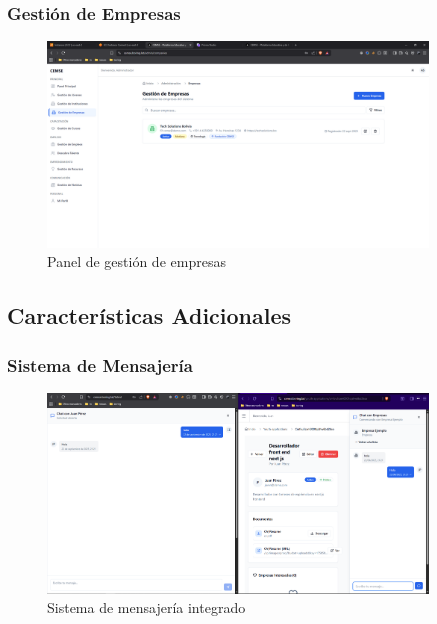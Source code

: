 \documentclass[12pt,a4paper]{article}
\begin{document}
\begin{enumerate}
\subsubsection{Gestión de Empresas}
\begin{figure}[H]
    \centering
    \includegraphics[width=0.9\textwidth]{screenshots/admin/company-management.png}
    \caption{Panel de gestión de empresas}
    \label{fig:admin-companies}
\end{figure}

\subsection{Características Adicionales}

\subsubsection{Sistema de Mensajería}
\begin{figure}[H]
    \centering
    \includegraphics[width=0.9\textwidth]{screenshots/features/messaging.png}
    \caption{Sistema de mensajería integrado}
    \label{fig:messaging}
\end{figure}


\end{enumerate}
\end{document}

